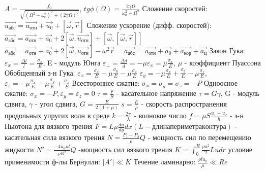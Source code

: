 \documentclass[10pt,a4paper]{article}
\begin{document}
\begin{flushleft}
$A=\frac{f_{0}}{\sqrt{(\Omega^2-\omega^{2}_{0})^2+(2\gamma\Omega)^2}}$, $tg\phi(\Omega)=\frac{2\gamma\Omega}{\omega^{2}_{0}-\Omega^2}$ \break
Сложение скоростей: $\vec{u_{\text{абс}}}=\vec{u_{\text{отн}}}+\vec{u_{0}}+[\vec{\omega}, \vec{r}]$ \break
Сложение ускорение (дифф. скоростей): $\vec{a_{\text{абс}}}=\vec{a_{\text{отн}}}+\vec{a_{0}}+2[\vec{\omega}, \vec{u_{\text{отн}}}]+[\vec{\omega}, [\vec{\omega}, \vec{r}]]$ \break
$\vec{a_{\text{абс}}}=\vec{a_{\text{отн}}}+\vec{a_{0}}+2[\vec{\omega}, \vec{u_{\text{отн}}}]-\omega^2\vec{r}=\vec{a_{\text{абс}}}=\vec{a_{\text{отн}}}+\vec{a_{0}}+\vec{a_{\text{кор}}}+\vec{a_{ц}}$ \break
Закон Гука: $\varepsilon_{x}=\frac{\Delta{l}}{l}=\frac{\sigma_{x}}{E}$, E - модуль Юнга \break
$\varepsilon_{\perp}=\frac{\Delta{d}}{d}=-\mu\varepsilon_{x}=\mu\frac{\sigma_{x}}{E}$, $\mu$ - коэффициент Пуассона \break
Обобщенный з-н Гука: $\varepsilon_{x}=\frac{\sigma_{x}}{E}-\mu\frac{\sigma_{y}}{E}-\mu\frac{\sigma_{z}}{E}$ \break
$\varepsilon_{y}=-\mu\frac{\sigma_{x}}{E}+\frac{\sigma_{y}}{E}-\mu\frac{\sigma_{z}}{E}$,\;\;\;$\varepsilon_{z}=-\mu\frac{\sigma_{x}}{E}-\mu\frac{\sigma_{y}}{E}+\frac{\sigma_{z}}{E}$ \break
Всестороннее сжатие: $\sigma_{x}=\sigma_{y}=\sigma_{z}=-P$ \break
Одноосное сжатие: $\sigma_{x}=-P, \varepsilon_{y}=\varepsilon_{z}=0$ \break
$\tau=\frac{F}{S}$ - касательное напряжение \break
$\tau=G\gamma$, G - модуль сдвига, $\gamma$ - угол сдвига, $G=\frac{E}{2(1+\mu)}$ \break
$s=\frac{E}{\rho}$ - скорость распространения продольных упругих волн в среде \break
$k=\frac{2\pi}{\lambda}$ - волновое число \break
$f=\mu{S}\frac{u_{1}-u_{2}}{h}$ - з-н Ньютона для вязкого трения \break
$F=L\mu\frac{du}{dy}dx (L - длина периметра контура)$ - касательная сила вязкого трения \break
$N=\frac{P_{1}-P_{2}}{\rho}Q$ - мощность сил по перемещению жидкости \break
$N'=\frac{-4u_{0}\mu{l}}{\rho{R^2}}Q$ -мощность сил вязкого трения \break
$K=\int^{R}_{0}\frac{\rho{u^2}}{2}Ludr$ условие применимости ф-лы Бернулли: $|A'|\ll{K}$ \break
Течение ламинарно: $\frac{\rho{lu_{0}}}{\mu}\ll{Re}$
\end{flushleft}
\end{document}
